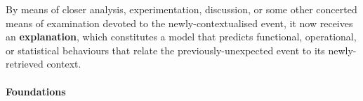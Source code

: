 \begin{defn}\label{def:explanation}
\hypertarget{def:explanation}{}By means of closer analysis, experimentation, discussion, or some
other concerted means of examination devoted to the
newly-contextualised event, it now receives an
\textbf{explanation}, which constitutes a model that predicts functional, operational, or statistical behaviours that relate the previously-unexpected event to its newly-retrieved context.
\end{defn}
\paragraph{\textbf{\upshape Foundations}}
                                         
